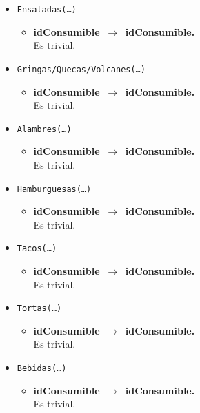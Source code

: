 \documentclass{article}
\newcommand{\flecha}{$\,\to\,$ }
\begin{document}
\begin{itemize}
\item \texttt{Ensaladas(\ldots)}
	\begin{itemize}
		\item \textbf{idConsumible \flecha idConsumible.}\\
		Es trivial.
	\end{itemize}

\item \texttt{Gringas/Quecas/Volcanes(\ldots)}
	\begin{itemize}
		\item \textbf{idConsumible \flecha idConsumible.}\\
		Es trivial.
	\end{itemize}

\item \texttt{Alambres(\ldots)}
	\begin{itemize}
		\item \textbf{idConsumible \flecha idConsumible.}\\
		Es trivial.
	\end{itemize}

\item \texttt{Hamburguesas(\ldots)}
	\begin{itemize}
		\item \textbf{idConsumible \flecha idConsumible.}\\
		Es trivial.
	\end{itemize}

\item \texttt{Tacos(\ldots)}
	\begin{itemize}
		\item \textbf{idConsumible \flecha idConsumible.}\\
		Es trivial.
	\end{itemize}

\item \texttt{Tortas(\ldots)}
	\begin{itemize}
		\item \textbf{idConsumible \flecha idConsumible.}\\
		Es trivial.
	\end{itemize}

\item \texttt{Bebidas(\ldots)}
	\begin{itemize}
		\item \textbf{idConsumible \flecha idConsumible.}\\
		Es trivial.
	\end{itemize}


\end{itemize}
\end{document}
